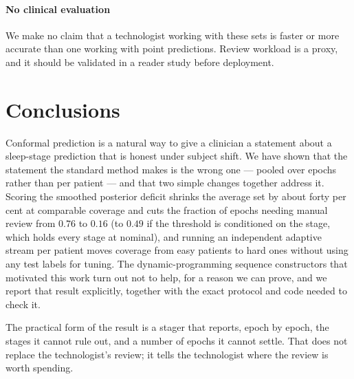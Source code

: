 \paragraph{No clinical evaluation}
We make no claim that a technologist working with these sets is faster or
more accurate than one working with point predictions. Review workload is a
proxy, and it should be validated in a reader study before deployment.

\section{Conclusions}
\label{sec:conclusion}

Conformal prediction is a natural way to give a clinician a statement about a
sleep-stage prediction that is honest under subject shift. We have shown
that the statement the standard method makes is the wrong one --- pooled over
epochs rather than per patient --- and that two simple changes together
address it.
Scoring
the smoothed posterior deficit shrinks the average set by about forty per cent
at comparable coverage and cuts the fraction of epochs needing manual
review from $0.76$ to $0.16$ (to $0.49$ if the threshold is conditioned on the
stage, which holds every stage at nominal), and running an independent
adaptive stream per patient moves coverage from easy patients to hard ones
without using any test labels for tuning. The dynamic-programming sequence constructors that
motivated this work turn out not to help, for a reason we can prove, and we
report that result explicitly, together with the exact protocol and code
needed to check it.

The practical form of the result is a stager that reports, epoch by epoch, the
stages it cannot rule out, and a number of epochs it cannot settle. That does
not replace the technologist's review; it tells the technologist where the
review is worth spending.
